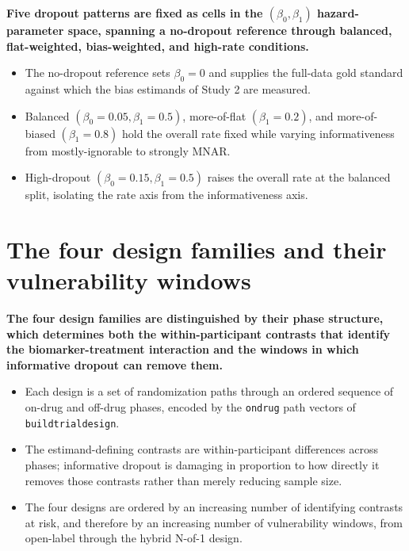 \documentclass[
  11pt,
]{article}
\begin{document}
\textbf{Five dropout patterns are fixed as cells in the $(\beta_0,\beta_1)$ hazard-parameter space, spanning a no-dropout reference through balanced, flat-weighted, bias-weighted, and high-rate conditions.}

\begin{itemize}\setlength{\itemsep}{2pt}\setlength{\parskip}{0pt}
\item The no-dropout reference sets $\beta_0 = 0$ and supplies the full-data gold standard against which the bias estimands of Study 2 are measured.
\item Balanced $(\beta_0 = 0.05, \beta_1 = 0.5)$, more-of-flat $(\beta_1 = 0.2)$, and more-of-biased $(\beta_1 = 0.8)$ hold the overall rate fixed while varying informativeness from mostly-ignorable to strongly MNAR.
\item High-dropout $(\beta_0 = 0.15, \beta_1 = 0.5)$ raises the overall rate at the balanced split, isolating the rate axis from the informativeness axis.
\end{itemize}

\section{The four design families and their vulnerability windows}\label{the-four-design-families-and-their-vulnerability-windows}

\textbf{The four design families are distinguished by their phase structure, which determines both the within-participant contrasts that identify the biomarker-treatment interaction and the windows in which informative dropout can remove them.}

\begin{itemize}\setlength{\itemsep}{2pt}\setlength{\parskip}{0pt}
\item Each design is a set of randomization paths through an ordered sequence of on-drug and off-drug phases, encoded by the \texttt{ondrug} path vectors of \texttt{buildtrialdesign}.
\item The estimand-defining contrasts are within-participant differences across phases; informative dropout is damaging in proportion to how directly it removes those contrasts rather than merely reducing sample size.
\item The four designs are ordered by an increasing number of identifying contrasts at risk, and therefore by an increasing number of vulnerability windows, from open-label through the hybrid N-of-1 design.
\end{itemize}
\end{document}
